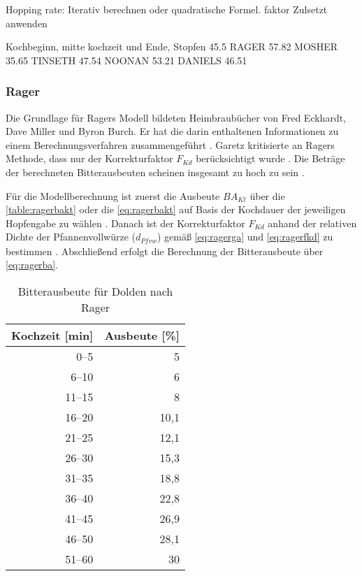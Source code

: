 \documentclass[a4paper,parskip=half]{scrartcl}
\newcommand{\BAKt}{{\mathit{BA}}_{\mathit{Kt}}}
\newcommand{\FKd}{F_{\mathit{Kd}}}
\newcommand{\dPfvw}{d_\mathit{Pfvw}}
\begin{document}
\parencite[63]{Hall1997}
Hopping rate:
Iterativ berechnen oder quadratische
Formel. 
faktor Zulsetzt anwenden

\parencite[65]{Hall1997}
Kochbeginn, mitte kochzeit und Ende, Stopfen
45.5
RAGER  57.82
MOSHER 35.65
TINSETH  47.54
NOONAN 53.21
DANIELS 46.51

\subsubsection*{Rager}

Die Grundlage für Ragers Modell bildeten Heimbraubücher von Fred Eckhardt,
Dave Miller und Byron Burch. Er hat die darin enthaltenen Informationen
zu einem Berechnungsverfahren zusammengeführt \parencite[53]{Rager1990}. 
Garetz kritisierte an Ragers Methode, dass nur der Korrekturfaktor
$\FKd$ berücksichtigt wurde \parencite[134]{Garetz1994}. Die Beträge
der berechneten Bitterausbeuten scheinen insgesamt zu hoch zu sein \parencite{Jones1995}.

Für die Modellberechnung ist zuerst die Ausbeute $\BAKt$ über die \autoref{table:ragerbakt}
oder die \autoref{eq:ragerbakt} auf Basis der Kochdauer der jeweiligen Hopfengabe
zu wählen \parencite{Steinmeyer2021}.
Danach ist der Korrekturfaktor $\FKd$ anhand der relativen Dichte der
Pfannenvollwürze ($\dPfvw$) gemäß \autoref{eq:ragerga} und \autoref{eq:ragerfkd}
zu bestimmen \parencite[53]{Rager1990}.
Abschließend erfolgt die Berechnung der Bitterausbeute über \autoref{eq:ragerba}.

\begin{table}[H]
\centering
\begin{tabular}{rr}
\toprule
\multicolumn{1}{c}{\textbf{Kochzeit [min]}} & \multicolumn{1}{c}{\textbf{Ausbeute [\%]}} \\
\midrule
0–5             & 5 \\
6–10            & 6 \\
11–15           & 8 \\
16–20           & 10,1 \\
21–25           & 12,1 \\
26–30           & 15,3 \\
31–35           & 18,8 \\
36–40           & 22,8 \\
41–45           & 26,9 \\
46–50           & 28,1 \\
51–60           & 30 \\
\bottomrule
\end{tabular}
\caption{Bitterausbeute für Dolden nach Rager \parencite[54]{Rager1990}}
\label{table:ragerbakt}
\end{table}
\end{document}
